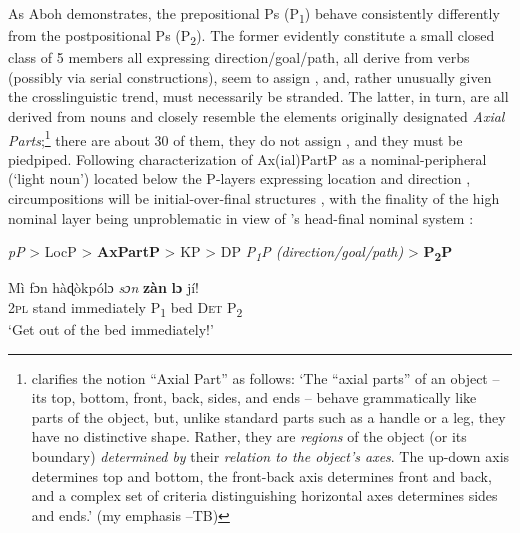 \documentclass[output=paper]{LSP/langsci}
\begin{document}
As Aboh demonstrates, the prepositional Ps (P\textsubscript{1}) behave consistently differently from the postpositional Ps (P\textsubscript{2}). The former evidently constitute a small closed class of 5 members all expressing direction/goal/path, all derive from verbs (possibly via serial constructions), seem to assign , and, rather unusually given the crosslinguistic trend, must necessarily be stranded. The latter, in turn, are all derived from nouns and closely resemble the elements \citet{Jackendoff1996} originally designated \textit{Axial Parts};\footnote{\citet[14]{Jackendoff1996} clarifies the notion ``Axial Part'' as follows: ‘The “axial parts” of an object – its top, bottom, front, back, sides, and ends – behave grammatically like parts of the object, but, unlike standard parts such as a handle or a leg, they have no distinctive shape. Rather, they are \textit{regions} of the object (or its boundary) \textit{determined by} their \textit{relation to the object’s axes}. The up-down axis determines top and bottom, the front-back axis determines front and back, and a complex set of criteria distinguishing horizontal axes determines sides and ends.’ (my emphasis –TB)} there are about 30 of them, they do not assign , and they must be piedpiped. Following  characterization of Ax(ial)PartP as a nominal-peripheral (‘light noun’)  located below the P-layers expressing location and direction ,  circumpositions will be initial-over-final structures , with the finality of the high nominal layer being unproblematic in view of ’s head-final nominal system :

\ea \label{ex:biberauer:55}
\ea \label{ex:biberauer:55a}
  \textit{pP} > LocP > \textbf{AxPartP} > KP > DP    
 \ex \label{ex:biberauer:55b}
  \textit{P}\textit{\textsubscript{1}}\textit{P (direction/goal/path)} > \textbf{P}\textbf{\textsubscript{2}}\textbf{P} \citep{Aboh2010}

 \ex \label{ex:biberauer:55c}
\gll   Mì   fɔn     hàɖòkpólɔ     \textit{sɔn} \textbf{zàn} \textbf{lɔ}      jí!\\
  \textsc{2pl}  stand  immediately P\textsubscript{1}   bed  \textsc{Det}  P\textsubscript{2}\\

\glt ‘Get out of the bed immediately!’     \citep[229]{Aboh2010}
\z 
\z
\end{document}
